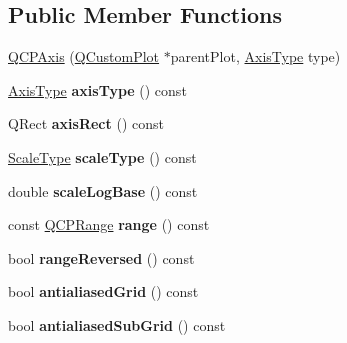\subsection*{Public Member Functions}
\begin{DoxyCompactItemize}
\item 
\hyperlink{classQCPAxis_a5a34dafa051be08d03e89c163c507f90}{Q\-C\-P\-Axis} (\hyperlink{classQCustomPlot}{Q\-Custom\-Plot} $\ast$parent\-Plot, \hyperlink{classQCPAxis_ae2bcc1728b382f10f064612b368bc18a}{Axis\-Type} type)
\item 
\hypertarget{classQCPAxis_a593c37bf6aa4990326dc09e24f45db7f}{\hyperlink{classQCPAxis_ae2bcc1728b382f10f064612b368bc18a}{Axis\-Type} {\bfseries axis\-Type} () const }\label{classQCPAxis_a593c37bf6aa4990326dc09e24f45db7f}

\item 
\hypertarget{classQCPAxis_a7fe5b84f4891838b63ed5181f5811dc5}{Q\-Rect {\bfseries axis\-Rect} () const }\label{classQCPAxis_a7fe5b84f4891838b63ed5181f5811dc5}

\item 
\hypertarget{classQCPAxis_a8563e13407bc0616da7f7c84e02de170}{\hyperlink{classQCPAxis_a36d8e8658dbaa179bf2aeb973db2d6f0}{Scale\-Type} {\bfseries scale\-Type} () const }\label{classQCPAxis_a8563e13407bc0616da7f7c84e02de170}

\item 
\hypertarget{classQCPAxis_ac937d2a602f865aff2ab6c1e288739f6}{double {\bfseries scale\-Log\-Base} () const }\label{classQCPAxis_ac937d2a602f865aff2ab6c1e288739f6}

\item 
\hypertarget{classQCPAxis_ab1ea79a4f5ea4cf42620f8f51c477ac4}{const \hyperlink{classQCPRange}{Q\-C\-P\-Range} {\bfseries range} () const }\label{classQCPAxis_ab1ea79a4f5ea4cf42620f8f51c477ac4}

\item 
\hypertarget{classQCPAxis_ade26dc7994ccd8a11f64fd83377ee021}{bool {\bfseries range\-Reversed} () const }\label{classQCPAxis_ade26dc7994ccd8a11f64fd83377ee021}

\item 
\hypertarget{classQCPAxis_aaf64c7d5af0e194b9353e8b96e6f5573}{bool {\bfseries antialiased\-Grid} () const }\label{classQCPAxis_aaf64c7d5af0e194b9353e8b96e6f5573}

\item 
\hypertarget{classQCPAxis_aedb15f6b0502d3b0c5fc995f3609d0ea}{bool {\bfseries antialiased\-Sub\-Grid} () const }\label{classQCPAxis_aedb15f6b0502d3b0c5fc995f3609d0ea}


\end{DoxyCompactItemize}
